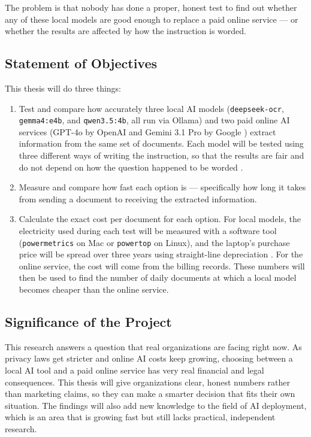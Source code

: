 The problem is that nobody has done a proper, honest test to find out whether any of these local models are good enough to replace a paid online service --- or whether the results are affected by how the instruction is worded.

\subsection{Statement of Objectives}

This thesis will do three things:

\begin{enumerate}
    \item Test and compare how accurately three local AI models (\texttt{deepseek-ocr}, \texttt{gemma4:e4b}, and \texttt{qwen3.5:4b}, all run via Ollama) and two paid online AI services (GPT-4o by OpenAI \cite{openai_gpt4o_2024} and Gemini 3.1 Pro by Google \cite{google_gemini_2025}) extract information from the same set of documents. Each model will be tested using three different ways of writing the instruction, so that the results are fair and do not depend on how the question happened to be worded \cite{anlsstar_2024, gemma4_phi4_qwen3_2026}.
    \item Measure and compare how fast each option is --- specifically how long it takes from sending a document to receiving the extracted information.
    \item Calculate the exact cost per document for each option. For local models, the electricity used during each test will be measured with a software tool (\texttt{powermetrics} on Mac or \texttt{powertop} on Linux), and the laptop's purchase price will be spread over three years using straight-line depreciation \cite{lenovo_tco_2026}. For the online service, the cost will come from the billing records. These numbers will then be used to find the number of daily documents at which a local model becomes cheaper than the online service.
\end{enumerate}

\subsection{Significance of the Project}

This research answers a question that real organizations are facing right now. As privacy laws get stricter and online AI costs keep growing, choosing between a local AI tool and a paid online service has very real financial and legal consequences. This thesis will give organizations clear, honest numbers rather than marketing claims, so they can make a smarter decision that fits their own situation. The findings will also add new knowledge to the field of AI deployment, which is an area that is growing fast but still lacks practical, independent research.
